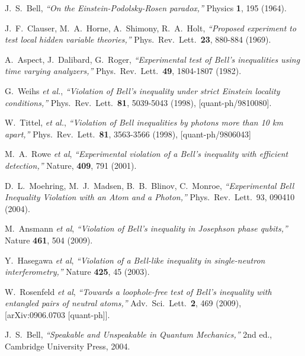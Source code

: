 \documentclass{svjour2}                    %
\begin{document}
\begin{thebibliography}{}

  J.~S.~Bell,
  {\it ``On the Einstein-Podolsky-Rosen paradox,''}
  Physics {\bf 1}, 195 (1964).

  J.~F.~Clauser, M.~A.~Horne, A.~Shimony, R.~A.~Holt,
  {\it ``Proposed experiment to test local hidden variable theories,''}
  Phys.\ Rev.\ Lett.\  {\bf 23}, 880-884 (1969).

  A.~Aspect, J.~Dalibard, G.~Roger,
  {\it ``Experimental test of Bell's inequalities using time varying analyzers,''}
  Phys.\ Rev.\ Lett.\  {\bf 49}, 1804-1807 (1982).

  G.~Weihs {\it et al.},
  {\it ``Violation of Bell's inequality under strict Einstein locality conditions,''}
  Phys.\ Rev.\ Lett.\  {\bf 81}, 5039-5043 (1998),
  [quant-ph/9810080].

  W.~Tittel, {\it et al.},
  {\it ``Violation of Bell inequalities by photons more than 10 km apart,''}
  Phys.\ Rev.\ Lett.\  {\bf 81}, 3563-3566 (1998),
  [quant-ph/9806043]


 M.~A.~Rowe {\it et al}, {\it ``Experimental violation of a Bell's inequality with efficient detection,''} Nature, {\bf 409},
791 (2001).


 D.~L.~Moehring, M.~J.~Madsen, B.~B.~Blinov, C.~Monroe, {\it ``Experimental Bell Inequality Violation with an Atom and a Photon,''}
Phys.\ Rev.\ Lett.\ 93, 090410 (2004).

 M.~Ansmann {\it et al}, {\it ``Violation of Bell's inequality in Josephson phase qubits,''} Nature 
{\bf 461}, 504 (2009).

 Y.~Hasegawa {\it et al}, {\it ``Violation of a Bell-like inequality in single-neutron interferometry,''}
Nature {\bf 425}, 45 (2003).

 W.~Rosenfeld {\it et al}, {\it ``Towards a loophole-free test of Bell's inequality with entangled pairs of neutral atoms,''}
Adv.\ Sci.\ Lett.\ {\bf 2}, 469 (2009), [arXiv:0906.0703 [quant-ph]].


 J.~S.~Bell, {\it ``Speakable and Unspeakable in Quantum Mechanics,''} 2nd ed., Cambridge University Press, 2004.  


\end{thebibliography}
\end{document}
